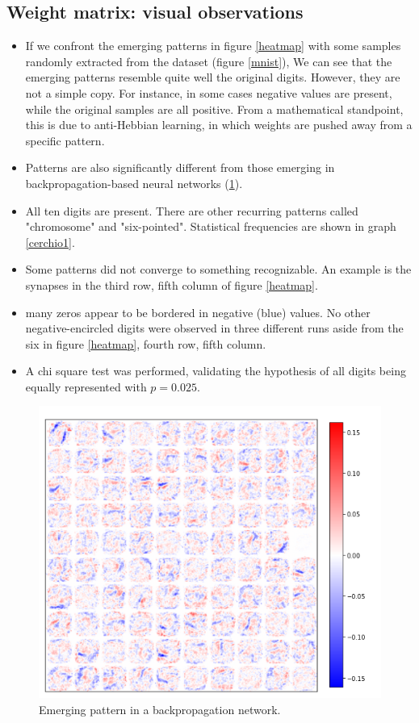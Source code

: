 \documentclass[a4paper]{report}
\begin{document}
\subsection{Weight matrix: visual observations}

\begin{itemize}
    \item If we confront the emerging patterns in figure \ref{heatmap} with some samples randomly extracted from the dataset (figure \ref{mnist}), We can see that the emerging patterns resemble quite well the original digits. However, they are not a simple copy. For instance, in some cases negative values are present, while the original samples are all positive. From a mathematical standpoint, this is due to anti-Hebbian learning, in which weights are pushed away from a specific pattern.
    \item Patterns are also significantly different from those emerging in backpropagation-based neural networks (\ref{backnet}).
    \item All ten digits are present. There are other recurring patterns called "chromosome" and "six-pointed". Statistical frequencies are shown in graph \ref{cerchio1}. 
    \item Some patterns did not converge to something recognizable. An example is the synapses in the third row, fifth column of figure \ref{heatmap}.
    \item many zeros appear to be bordered in negative (blue) values. No other negative-encircled digits were observed in three different runs aside from the six in figure \ref{heatmap}, fourth row, fifth column.
    \item A chi square test was performed, validating the hypothesis of all digits being equally represented with $p  = 0.025$.
    \end{itemize}

\begin{figure} [H]
    \centering
    \includegraphics [width = 12cm] {h/backnet.png}
    \caption{Emerging pattern in a backpropagation network. }
    \label{backnet}
\end{figure}
\end{document}
